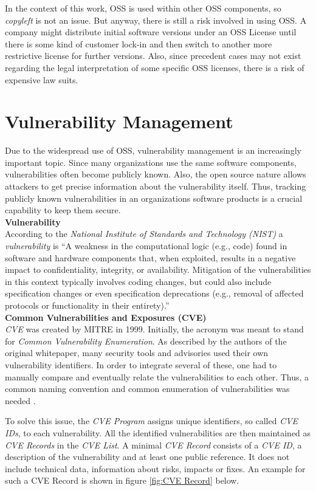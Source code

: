 In the context of this work, OSS is used within other OSS components, so \textit{copyleft} is not an issue. But anyway, there is still a risk involved in using OSS. A company might distribute initial software versions under an OSS License until there is some kind of customer lock-in and then switch to another more restrictive license for further versions. Also, since precedent cases may not exist regarding the legal interpretation of some specific OSS licenses, there is a risk of expensive law suits.

\section{Vulnerability Management} \label{sec:Vulnerability Management}
Due to the widespread use of OSS, vulnerability management is an increasingly important topic. Since many organizations use the same software components, vulnerabilities often become publicly known. Also, the open source nature allows attackers to get precise information about the vulnerability itself. Thus, tracking publicly known vulnerabilities in an organizations software products is a crucial capability to keep them secure.\\

\noindent
\textbf{Vulnerability}\\
\noindent
According to the \emph{National Institute of Standards and Technology (NIST)} a \emph{vulnerability} is \enquote{A weakness in the computational logic (e.g., code) found in software and hardware components that, when exploited, results in a negative impact to confidentiality, integrity, or availability. Mitigation of the vulnerabilities in this context typically involves coding changes, but could also include specification changes or even specification deprecations (e.g., removal of affected protocols or functionality in their entirety).}\cite{NVDWebsite}\\

\noindent
\textbf{Common Vulnerabilities and Exposures (CVE)}\\
\noindent 
\emph{CVE} was created by MITRE in 1999. Initially, the acronym was meant to stand for \textit{Common Vulnerability Enumeration}. As described by the authors of the original whitepaper, many security tools and advisories used their own vulnerability identifiers. In order to integrate several of these, one had to manually compare and eventually relate the vulnerabilities to each other. Thus, a common naming convention and common enumeration of vulnerabilities was needed \cite{CVEOriginal}.\par
To solve this issue, the \textit{CVE Program} assigns unique identifiers, so called \textit{CVE IDs}, to each vulnerability. All the identified vulnerabilities are then maintained as \textit{CVE Records} in the \textit{CVE List}. A minimal \textit{CVE Record} consists of a \textit{CVE ID}, a description of the vulnerability and at least one public reference. It does not include technical data, information about risks, impacts or fixes. An example for such a CVE Record is shown in figure \ref{fig:CVE Record} below.

